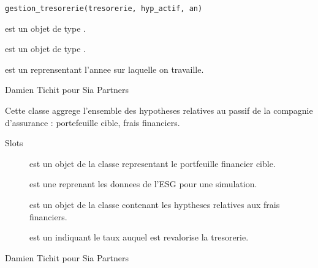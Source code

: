 \documentclass[a4paper]{book}
\begin{document}
%
\begin{Usage}
\begin{verbatim}
gestion_tresorerie(tresorerie, hyp_actif, an)
\end{verbatim}
\end{Usage}
%
\begin{Arguments}
\begin{ldescription}
\item[\code{tresorerie}] est un objet de type .

\item[\code{hyp\_actif}] est un objet de type .

\item[\code{an}] est un  reprensentant l'annee sur laquelle on travaille.
\end{ldescription}
\end{Arguments}
%
\begin{Author}\relax
Damien Tichit pour Sia Partners
\end{Author}
%
\begin{Description}\relax
Cette classe aggrege l'ensemble des hypotheses relatives au passif de la compagnie d'assurance : portefeuille cible, frais financiers.
\end{Description}
%
\begin{Section}{Slots}

\begin{description}

\item[] est un objet de la classe  representant le portfeuille financier cible.

\item[] est une  reprenant les donnees de l'ESG pour une simulation.

\item[] est un objet de la classe  contenant les hyptheses relatives aux frais financiers.

\item[] est un  indiquant le taux auquel est revalorise la tresorerie.

\end{description}
\end{Section}
%
\begin{Author}\relax
Damien Tichit pour Sia Partners
\end{Author}
\end{document}
